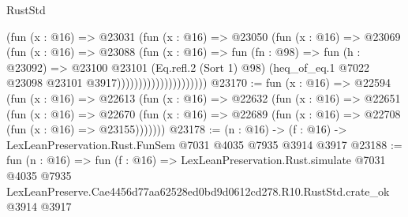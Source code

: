 \begin{lexlean}{RustStd}
\begin{coremodule}
                                  (fun (x : @16) =>
                                  @23031
                                    (fun (x : @16) =>
                                    @23050
                                      (fun (x : @16) =>
                                      @23069
                                        (fun (x : @16) =>
                                        @23088
                                          (fun (x : @16) =>
                                          fun (fn : @98) =>
                                          fun (h : @23092) =>
                                          @23100
                                            @23101
                                            (Eq.refl.{2} (Sort 1) @98)
                                            (heq_of_eq.{1}
                                              @7022
                                              @23098
                                              @23101
                                              @3917)))))))))))))))))))))
@23170 := fun (x : @16) =>
  @22594
    (fun (x : @16) =>
    @22613
      (fun (x : @16) =>
      @22632
        (fun (x : @16) =>
        @22651
          (fun (x : @16) =>
          @22670 (fun (x : @16) => @22689 (fun (x : @16) => @22708 (fun (x : @16) => @23155)))))))
@23178 := (n : @16) -> (f : @16) -> LexLeanPreservation.Rust.FunSem @7031 @4035 @7935 @3914 @3917
@23188 := fun (n : @16) =>
  fun (f : @16) =>
  LexLeanPreservation.Rust.simulate
    @7031
    @4035
    @7935
    LexLeanPreserve.Cae4456d77aa62528ed0bd9d0612cd278.R10.RustStd.crate_ok
    @3914
    @3917
\end{coremodule}
\end{lexlean}
